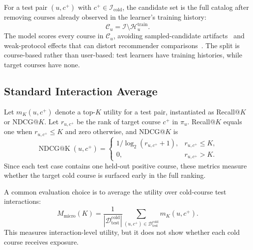 \documentclass[letterpaper]{article}
\begin{document}
For a test pair \((u,c^+)\) with \(c^+\in\mathcal{I}_{\mathrm{cold}}\), the candidate set is the full catalog after removing courses already observed in the learner's training history:
\begin{equation}
\mathcal{C}_u=\mathcal{I}\setminus \mathcal{H}^{\mathrm{train}}_u .
\end{equation}
The model scores every course in \(\mathcal{C}_u\), avoiding sampled-candidate artifacts~\cite{krichene2020sampled,li2024itemsampling} and weak-protocol effects that can distort recommender comparisons~\cite{dacrema2019progress,hidasi2023flaws}. The split is course-based rather than user-based: test learners have training histories, while target courses have none.

\subsection{Standard Interaction Average}
Let \(m_K(u,c^+)\) denote a top-\(K\) utility for a test pair, instantiated as Recall@\(K\) or NDCG@\(K\). Let \(r_{u,c^+}\) be the rank of target course \(c^+\) in \(\pi_u\). Recall@\(K\) equals one when \(r_{u,c^+}\le K\) and zero otherwise, and NDCG@\(K\) is
\begin{equation}
\operatorname{NDCG@K}(u,c^+)=
\begin{cases}
1/\log_2(r_{u,c^+}+1), & r_{u,c^+}\le K,\\
0, & r_{u,c^+}>K.
\end{cases}
\end{equation}
Since each test case contains one held-out positive course, these metrics measure whether the target cold course is surfaced early in the full ranking.

A common evaluation choice is to average the utility over cold-course test interactions:
\begin{equation}
M_{\mathrm{micro}}(K)=
\frac{1}{|\mathcal{D}^{\mathrm{cold}}_{\mathrm{test}}|}
\sum_{(u,c^+)\in \mathcal{D}^{\mathrm{cold}}_{\mathrm{test}}}
m_K(u,c^+).
\end{equation}
This measures interaction-level utility, but it does not show whether each cold course receives exposure.
\end{document}
